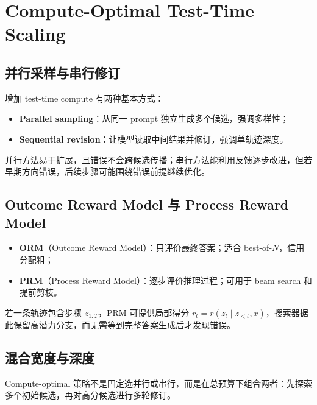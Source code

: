 \section{Compute-Optimal Test-Time Scaling}

\subsection{并行采样与串行修订}

增加 test-time compute 有两种基本方式：

\begin{itemize}
    \item \textbf{Parallel sampling}：从同一 prompt 独立生成多个候选，强调多样性；
    \item \textbf{Sequential revision}：让模型读取中间结果并修订，强调单轨迹深度。
\end{itemize}


并行方法易于扩展，且错误不会跨候选传播；串行方法能利用反馈逐步改进，但若早期方向错误，后续步骤可能围绕错误前提继续优化。

\subsection{Outcome Reward Model 与 Process Reward Model}


\begin{itemize}
    \item \textbf{ORM}（Outcome Reward Model）：只评价最终答案；适合 best-of-$N$，信用分配粗；
    \item \textbf{PRM}（Process Reward Model）：逐步评价推理过程；可用于 beam search 和提前剪枝。
\end{itemize}

若一条轨迹包含步骤 $z_{1:T}$，PRM 可提供局部得分 $r_t=r(z_t\mid z_{<t},x)$，搜索器据此保留高潜力分支，而无需等到完整答案生成后才发现错误。

\subsection{混合宽度与深度}

Compute-optimal 策略不是固定选并行或串行，而是在总预算下组合两者：先探索多个初始候选，再对高分候选进行多轮修订。

